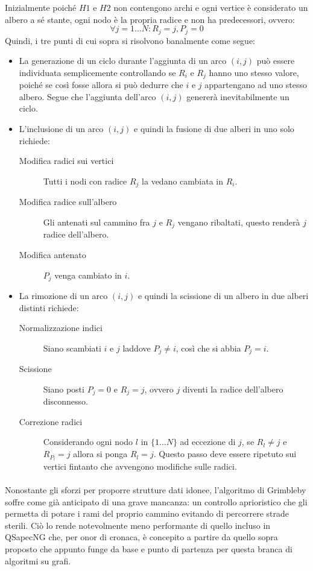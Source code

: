 Inizialmente poiché $H1$ e $H2$ non contengono archi e ogni vertice è considerato un albero a sé stante, ogni nodo è la propria radice e non ha predecessori, ovvero:
$$ \forall j=1\dots N : R_j = j, P_j = 0 $$
Quindi, i tre punti di cui sopra si risolvono banalmente come segue:
\begin{itemize}
 \item La generazione di un ciclo durante l'aggiunta di un arco $(i, j)$ può essere individuata semplicemente controllando se $R_i$ e $R_j$ hanno uno stesso valore, poiché se così fosse allora si può dedurre che $i$ e $j$ appartengano ad uno stesso albero. Segue che l'aggiunta dell'arco $(i, j)$ genererà inevitabilmente un ciclo.
 \item L'inclusione di un arco $(i, j)$ e quindi la fusione di due alberi in uno solo richiede:
           \begin{description}
            \item[Modifica radici sui vertici] Tutti i nodi con radice $R_j$ la vedano cambiata in $R_i$.
            \item[Modifica radice sull'albero] Gli antenati sul cammino fra $j$ e $R_j$ vengano ribaltati, questo renderà $j$ radice dell'albero.
            \item[Modifica antenato] $P_j$ venga cambiato in $i$.
           \end{description}
 \item La rimozione di un arco $(i, j)$ e quindi la scissione di un albero in due alberi distinti richiede:
           \begin{description}
            \item[Normalizzazione indici] Siano scambiati $i$ e $j$ laddove $P_j \neq i$, così che si abbia $P_j = i$.
            \item[Scissione] Siano posti $P_j = 0$ e $R_j = j$, ovvero $j$ diventi la radice dell'albero disconnesso.
            \item[Correzione radici] Considerando ogni nodo $l$ in $\{ 1\dots N\}$ ad eccezione di $j$, se $R_l \neq j$ e $R_{P_l} = j$ allora si ponga $R_l = j$. Questo passo deve essere ripetuto sui vertici fintanto che avvengono modifiche sulle radici.
           \end{description}
\end{itemize}

\paragraph{}
Nonostante gli sforzi per proporre strutture dati idonee, l'algoritmo di Grimbleby soffre come già anticipato di una grave mancanza: un controllo aprioristico che gli permetta di potare i rami del proprio cammino evitando di percorrere strade sterili. Ciò lo rende notevolmente meno performante di quello incluso in QSapecNG che, per onor di cronaca, è concepito a partire da quello sopra proposto che appunto funge da base e punto di partenza per questa branca di algoritmi su grafi. 

